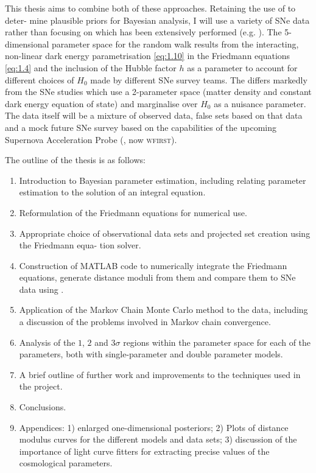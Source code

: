 This thesis aims to combine both of these approaches. Retaining the use of \mcmc{} to deter- mine plausible priors for Bayesian analysis, I will use a variety of SNe data rather than focusing on \cmb{} which has been extensively performed (e.g. \cite{LewisBridle2002}). The 5-dimensional parameter space for the \mcmc{} random walk results from the interacting, non-linear dark energy parametrisation \cref{eq:1.10} in the Friedmann equations \cref{eq:1.4} and the inclusion of the Hubble factor $h$ as a parameter to account for different choices of $H_0$ made by different SNe survey teams. The differs markedly from the SNe studies \cite{Hicken2009,Kowalski2008,Riess2007} which use a 2-parameter space (matter density and constant dark energy equation of state) and marginalise over $H_0$ as a nuisance parameter. The data itself will be a mixture of observed data, false sets based on that data and a mock future SNe survey based on the capabilities of the upcoming Supernova Acceleration Probe (\snap{}, now \textsc{wfirst}).

The outline of the thesis is as follows:
\begin{enumerate}
    \item Introduction to Bayesian parameter estimation, including relating parameter estimation to the solution of an integral equation.
    \item Reformulation of the Friedmann equations for numerical use.
    \item Appropriate choice of observational data sets and projected set creation using the Friedmann equa- tion solver.
    \item Construction of MATLAB code to numerically integrate the Friedmann equations, generate distance moduli from them and compare them to SNe data using \mcmc{}.
    \item Application of the Markov Chain Monte Carlo method to the data, including a discussion of the problems involved in Markov chain convergence.
    \item Analysis of the $1$, $2$ and $3\sigma$ regions within the parameter space for each of the parameters, both with single-parameter and double parameter models.
    \item A brief outline of further work and improvements to the techniques used in the project. 
    \item Conclusions.
    \item Appendices: 1) enlarged one-dimensional posteriors; 2) Plots of distance modulus curves for the different models and data sets; 3) discussion of the importance of light curve fitters for extracting precise values of the cosmological parameters.
\end{enumerate}
